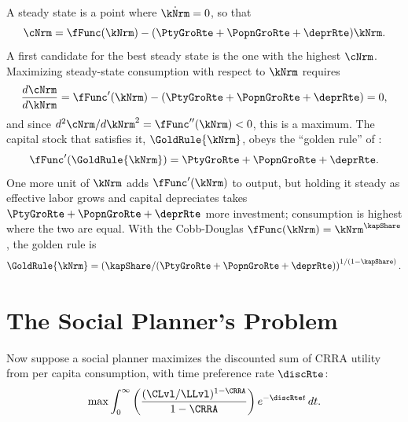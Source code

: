 \documentclass{econark}
\begin{document}
A steady state is a point where $\dot{\kNrm} = 0$, so that
\begin{equation}
  \cNrm = \fFunc(\kNrm) - (\PtyGroRte +\PopnGroRte+\deprRte) \kNrm . \label{eq:RCK-cSteadyState}
\end{equation}
A first candidate for the best steady state is the one with the highest $\cNrm$. Maximizing steady-state consumption with respect to $\kNrm$ requires
\begin{equation*}
  \frac{d\cNrm}{d\kNrm} = \fFunc^{\prime}(\kNrm) - (\PtyGroRte +\PopnGroRte+\deprRte) = 0 ,
\end{equation*}
and since $d^{2}\cNrm/d\kNrm^{2} = \fFunc^{\prime\prime}(\kNrm) < 0$, this is a maximum. The capital stock that satisfies it, $\GoldRule{\kNrm}$, obeys the ``golden rule'' of \citet{phelps:golden}:
\begin{equation}
  \fFunc^{\prime}(\GoldRule{\kNrm}) = \PtyGroRte +\PopnGroRte+\deprRte . \label{eq:RCK-goldenRule}
\end{equation}
One more unit of $\kNrm$ adds $\fFunc^{\prime}(\kNrm)$ to output, but holding it steady as effective labor grows and capital depreciates takes $\PtyGroRte +\PopnGroRte+\deprRte$ more investment; consumption is highest where the two are equal. With the Cobb-Douglas $\fFunc(\kNrm) = \kNrm^{\kapShare}$, the golden rule is
\begin{equation}
  \GoldRule{\kNrm} = \left(\kapShare/(\PtyGroRte +\PopnGroRte+\deprRte)\right)^{1/(1-\kapShare)} . \label{eq:RCK-goldenRuleCobbDouglas}
\end{equation}

\section{The Social Planner's Problem}

Now suppose a social planner maximizes the discounted
sum of CRRA utility from per capita consumption, with time preference rate $\discRte$:
\begin{equation}
  \max \int_{0}^{\infty} \left(\frac{(\CLvl/\LLvl)^{1-\CRRA}}{1-\CRRA}\right) e^{-\discRte  t}\,dt . \label{eq:RCK-maxprob}
\end{equation}
\end{document}

